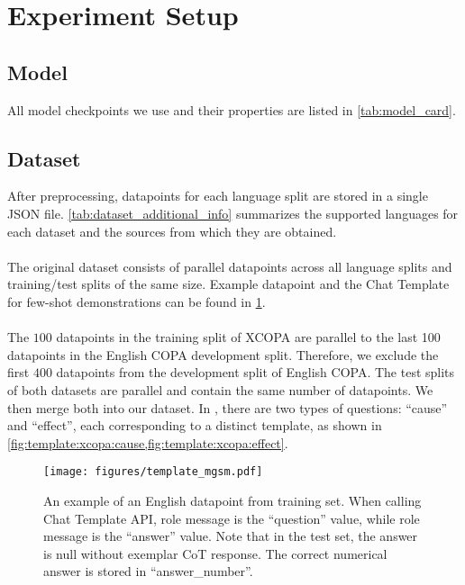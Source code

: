 \section{Experiment Setup} \label{app:setup}
\subsection{Model} \label{app:model}

All model checkpoints we use and their properties are listed in \cref{tab:model_card}.


\subsection{Dataset} \label{app:dataset}

After preprocessing, datapoints for each language split are stored in a single JSON file. \cref{tab:dataset_additional_info} summarizes the supported languages for each dataset and the sources from which they are obtained.


\paragraph{\mgsm} The original dataset consists of parallel datapoints across all language splits and training/test splits of the same size. Example datapoint and the Chat Template for few-shot demonstrations can be found in \cref{fig:template:mgsm}.



\paragraph{\xcopa} The $100$ datapoints in the training split of XCOPA are parallel to the last 100 datapoints in the English COPA development split. Therefore, we exclude the first $400$ datapoints from the development split of English COPA. The test splits of both datasets are parallel and contain the same number of datapoints. We then merge both into our \xcopa dataset. In \xcopa, there are two types of questions: ``cause'' and ``effect'', each corresponding to a distinct template, as shown in \cref{fig:template:xcopa:cause,fig:template:xcopa:effect}.


\begin{figure}[!ht]
    \centering
    \texttt{[image: figures/template\_mgsm.pdf]}
    \caption{An example of an English datapoint from \mgsm training set. When calling Chat Template API, \user role message is the ``question'' value, while \assistant role message is the ``answer'' value. Note that in the test set, the answer is null without exemplar CoT response. The correct numerical answer is stored in ``answer\_number''.}
    \label{fig:template:mgsm}
\end{figure}

